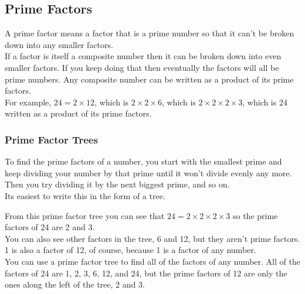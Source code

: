\documentclass[12pt]{article}
\begin{document}
\begin{enumerate}
\subsection*{Prime Factors}
A prime factor means a factor that is a prime number so that it can’t be broken down into any smaller factors.\\

If a factor is itself a composite number then it can be broken down into even smaller factors. If you keep doing that then eventually the factors will all be prime numbers. Any composite number can be written as a product of its prime factors.\\

For example, $24 = 2 \times 12$, which is $2 \times 2 \times 6$, which is $2\times 2 \times 2 \times 3$, which is 24 written as a product of its prime factors.

\subsubsection*{Prime Factor Trees}

To find the prime factors of a number, you start with the smallest prime and keep dividing your number by that prime until it won’t divide evenly any more. Then you try dividing it by the next biggest prime, and so on.\\

Its easiest to write this in the form of a tree.

\begin{center}
\end{center}

From this prime factor tree you can see that $24 = 2 \times 2 \times 2 \times 3$ so the prime factors of 24 are 2 and 3.\\

You can also see other factors in the tree, 6 and 12, but they aren’t prime factors. 1 is also a factor of 12, of course, because 1 is a factor of any number.\\

You can use a prime factor tree to find all of the factors of any number. All of the factors of 24 are 1, 2, 3, 6, 12, and 24, but the prime factors of 12 are only the ones along the left of the tree, 2 and 3.\\


\end{enumerate}
\end{document}
